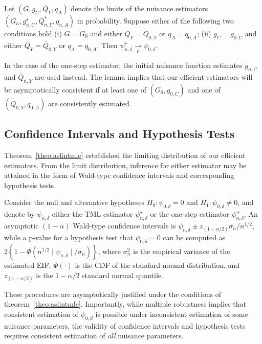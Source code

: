 \begin{lemma}\label{lemma:mult_robust}
  Let $(G, g_{C}, \overline{Q}_{Y}, q_{A})$ denote the limits of the nuisance
  estimators $(G_n, g^{\star}_{n,C}, \overline{Q}^{\star}_{n,Y}, q_{n,A})$ in
  probability. Suppose either of the following two conditions hold (i)
  $G = G_0$ and either $\overline{Q}_{Y} = \overline{Q}_{0,Y}$ or $q_{A} =
  q_{0,A}$; (ii) $g_{C} = g_{0,C}$ and either $\overline{Q}_{Y} =
  \overline{Q}_{0,Y}$ or $q_{A} = q_{0,A}$. Then $\psi_{n,\delta}^{\star}
  \xrightarrow[p]{} \psi_{0,\delta}$.
\end{lemma}
In the case of the one-step estimator, the initial nuisance function estimates
$g_{n,C}$ and $\overline{Q}_{n,Y}$ are used instead. The lemma implies that our
efficient estimators will be asymptotically consistent if at least one of
$(G_0, g_{0,C})$ and one of $(\overline{Q}_{0,Y}, q_{0,A})$ are consistently
estimated.

\subsection{Confidence Intervals and Hypothesis Tests}\label{inference}

Theorem~\ref{theo:aslintmle} established the limiting distribution of our
efficient estimators. From the limit distribution, inference for either
estimator may be attained in the form of Wald-type confidence intervals and
corresponding hypothesis tests.

Consider the null and alternative hypotheses $H_0: \psi_{0,\delta} = 0$ and
$H_1: \psi_{0,\delta} \neq 0$, and denote by $\psi_{n,\delta}$ either the TML
estimator $\psi_{n,\delta}^{\star}$ or the one-step estimator
$\psi_{n,\delta}^{+}$. An asymptotic $(1 - \alpha)$ Wald-type confidence
intervals is $\psi_{n,\delta} \pm z_{\left(1 - \alpha/2\right)} \sigma_n
/ n^{1/2}$, while a p-value for a hypothesis test that $\psi_{0,\delta} = 0$ can
be computed as $2 \left\{1 - \Phi \left(n^{1/2} \mid \psi_{n,\delta}
\mid/\sigma_n \right) \right\}$, where $\sigma^2_n$ is the empirical variance of
the estimated EIF, $\Phi(\cdot)$ is the CDF of the standard normal distribution,
and $z_{\left(1 - \alpha/2\right)}$ is the $1-\alpha/2$ standard normal
quantile.

These procedures are asymptotically justified under the conditions of
theorem~\ref{theo:aslintmle}. Importantly, while multiple robustness implies
that consistent estimation of $\psi_{0,d}$ is possible under inconsistent
estimation of some nuisance parameters, the validity of confidence intervals and
hypothesis tests requires consistent estimation of \emph{all} nuisance
parameters.

